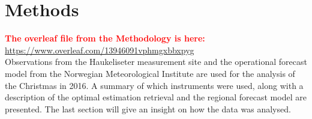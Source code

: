 \chapter{Methods}
\textcolor{red}{\textbf{The overleaf file from the Methodology is here:} \\ \url{https://www.overleaf.com/13946091vphmgxbbxpyg}} \\
Observations from the Haukeliseter measurement site and the operational forecast model from the Norwegian Meteorological Institute are used for the analysis of the Christmas in 2016. A summary of which instruments were used, along with a description of the optimal estimation retrieval and the regional forecast model are presented. The last section will give an insight on how the data was analysed. 







